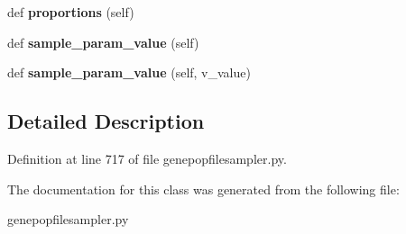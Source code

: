 \begin{DoxyCompactItemize}
\item 
def {\bfseries proportions} (self)\hypertarget{classnegui_1_1genepopfilesampler_1_1GenepopFileSampleParamsAgeStructureCohorts_a5363ca1316f528fbd345a1697f797ed6}{}\label{classnegui_1_1genepopfilesampler_1_1GenepopFileSampleParamsAgeStructureCohorts_a5363ca1316f528fbd345a1697f797ed6}

\item 
def {\bfseries sample\+\_\+param\+\_\+value} (self)\hypertarget{classnegui_1_1genepopfilesampler_1_1GenepopFileSampleParamsAgeStructureCohorts_ad0228b1755e08ee5396a4e08eb7c4b44}{}\label{classnegui_1_1genepopfilesampler_1_1GenepopFileSampleParamsAgeStructureCohorts_ad0228b1755e08ee5396a4e08eb7c4b44}

\item 
def {\bfseries sample\+\_\+param\+\_\+value} (self, v\+\_\+value)\hypertarget{classnegui_1_1genepopfilesampler_1_1GenepopFileSampleParamsAgeStructureCohorts_a9b3e052eb9da277bb815ba963b62eac7}{}\label{classnegui_1_1genepopfilesampler_1_1GenepopFileSampleParamsAgeStructureCohorts_a9b3e052eb9da277bb815ba963b62eac7}

\end{DoxyCompactItemize}


\subsection{Detailed Description}


Definition at line 717 of file genepopfilesampler.\+py.



The documentation for this class was generated from the following file\+:\begin{DoxyCompactItemize}
\item 
genepopfilesampler.\+py\end{DoxyCompactItemize}
